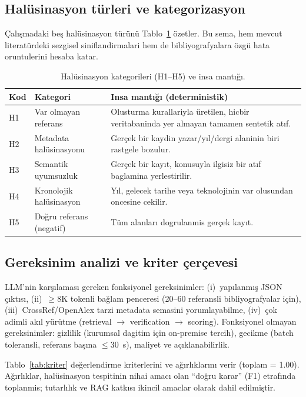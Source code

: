 \documentclass[11pt,a4paper]{article}
\begin{document}
\subsection{Halüsinasyon türleri ve kategorizasyon}
\label{sub:cat}
Çalışmadaki beş halüsinasyon türünü Tablo~\ref{tab:cat} özetler. Bu sema, hem
mevcut literatürdeki sezgisel siniflandirmalari
\cite{walters2023fabrication,huang2023hallucination} hem de bibliyografyalara
özgü hata oruntulerini hesaba katar.

\begin{table}[t]
\caption{Halüsinasyon kategorileri (H1--H5) ve insa mantığı.}
\label{tab:cat}\small
\begin{tabularx}{\columnwidth}{l l X}
\toprule
\textbf{Kod} & \textbf{Kategori} & \textbf{Insa mantığı (deterministik)} \\
\midrule
H1 & Var olmayan referans & Olusturma kurallariyla üretilen, hicbir veritabaninda yer almayan tamamen sentetik atıf. \\
H2 & Metadata halüsinasyonu & Gerçek bir kaydin yazar/yıl/dergi alaninin biri rastgele bozulur. \\
H3 & Semantik uyumsuzluk & Gerçek bir kayıt, konusuyla ilgisiz bir atıf baglamina yerlestirilir. \\
H4 & Kronolojik halüsinasyon & Yıl, gelecek tarihe veya teknolojinin var olusundan oncesine cekilir. \\
H5 & Doğru referans (negatif) & Tüm alanları dogrulanmis gerçek kayıt. \\
\bottomrule
\end{tabularx}
\end{table}

\subsection{Gereksinim analizi ve kriter çerçevesi}
\label{sub:kriter}
LLM'nin karşılaması gereken fonksiyonel gereksinimler: (i)~yapılanmış JSON
çıktısı, (ii)~$\geq$8K tokenli bağlam penceresi (20--60 referansli
bibliyografyalar için), (iii)~CrossRef/OpenAlex tarzi metadata semasini
yorumlayabilme, (iv)~çok adimli akıl yürütme (retrieval $\to$ verification
$\to$ scoring). Fonksiyonel olmayan gereksinimler: gizlilik (kurumsal dagitim
için on-premise tercih), gecikme (batch toleransli, referans başına $\leq$30~s),
maliyet ve açıklanabilirlik.

Tablo~\ref{tab:kriter} değerlendirme kriterlerini ve ağırlıklarını verir
(toplam = 1.00). Ağırlıklar, halüsinasyon tespitinin nihai amacı olan
``doğru karar'' (F1) etrafında toplanmis; tutarlılık ve RAG katkısı
ikincil amaclar olarak dahil edilmiştir.
\end{document}

